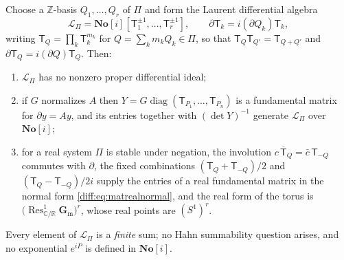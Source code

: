 \documentclass[11pt,letterpaper]{article}
\numberwithin{equation}{section}
\theoremstyle{definition}
\theoremstyle{remark}
\newcommand{\SC}{\mathbf{No}[i]}
\newcommand{\R}{\mathbb R}
\newcommand{\C}{\mathbb C}
\newcommand{\Z}{\mathbb Z}
\newcommand{\der}{\partial}
\newcommand{\gm}{\mathbf G_{\mathrm m}}
\begin{document}
\begin{proposition}
\label{diff:prop:matPValgebra}
Choose a $\Z$-basis $Q_{1},\dots,Q_{r}$ of $\Pi$ and form the Laurent
differential algebra
\begin{equation}\label{diff:eq:matPVring}
 \mathcal L_{\Pi}=\SC[\mathsf T_{1}^{\pm1},\dots,\mathsf T_{r}^{\pm1}],
 \qquad \der\mathsf T_{k}=i(\der Q_{k})\mathsf T_{k},
\end{equation}
writing $\mathsf T_{Q}=\prod_{k}\mathsf T_{k}^{m_{k}}$ for
$Q=\sum_{k}m_{k}Q_{k}\in\Pi$, so that $\mathsf T_{Q}\mathsf T_{Q'}=\mathsf
T_{Q+Q'}$ and $\der\mathsf T_{Q}=i(\der Q)\mathsf T_{Q}$. Then:
\begin{enumerate}[label=\textup{(\roman*)},leftmargin=2.4em]
\item $\mathcal L_{\Pi}$ has no nonzero proper differential ideal;
\item if $G$ normalizes $A$ then
$Y=G\operatorname{diag}(\mathsf T_{P_{1}},\dots,\mathsf T_{P_{n}})$ is a
fundamental matrix for $\der y=Ay$, and its entries together with
$(\det Y)^{-1}$ generate $\mathcal L_{\Pi}$ over $\SC$;
\item for a real system $\Pi$ is stable under negation, the involution
$\overline{c\,\mathsf T_{Q}}=\bar c\,\mathsf T_{-Q}$ commutes with $\der$,
the fixed combinations $(\mathsf T_{Q}+\mathsf T_{-Q})/2$ and
$(\mathsf T_{Q}-\mathsf T_{-Q})/2i$ supply the entries of a real fundamental
matrix in the normal form \cref{diff:eq:matrealnormal}, and the real form of
the torus is $\bigl(\operatorname{Res}^{1}_{\C/\R}\gm\bigr)^{r}$, whose real
points are $(S^{1})^{r}$.
\end{enumerate}
Every element of $\mathcal L_{\Pi}$ is a \emph{finite} sum; no Hahn
summability question arises, and no exponential $e^{iP}$ is defined in $\SC$.
\end{proposition}
\end{document}

